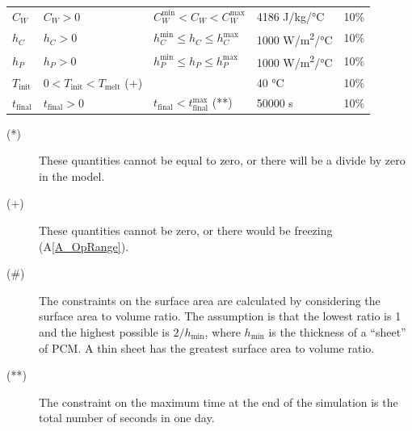\documentclass[12pt]{article}
\newcommand{\aref}[1]{A\ref{#1}}
\begin{document}
\begin{table}[!h]
\begin{longtable*}{l l l l c}
  $C_W$ & $C_W > 0$ & $C_W^{\text{min}} < C_W < C_W^{\text{max}}$ & 4186 
	\si[per-mode=symbol] {\joule\per\kilo\gram\per\celsius} & 10\%
  \\
  $h_C$ & $h_C > 0$ & $h_C^{\text{min}} \leq h_C \leq h_C^{\text{max}}$ 
	& 1000 \si[per-mode=symbol] {\watt\per\square\metre\per\celsius} & 10\%
  \\
  $h_P$ & $h_P > 0$ & $h_P^{\text{min}} \leq h_P \leq h_P^{\text{max}}$ 
	& 1000 \si[per-mode=symbol] {\watt\per\square\metre\per\celsius} & 10\%
  \\
  $T_\text{init}$ & $0 < T_\text{init} < T_\text{melt} $ (+) & & 40 \si[per-mode=symbol] {\celsius} & 10\%
  \\
  $t_\text{final}$ & $t_\text{final} > 0$ & $t_\text{final} < t_{\text{final}}^{\text{max}}$ (**) 
		& 50000 \si[per-mode=symbol] {\second} & 10\%
  \\
  \bottomrule
\end{longtable*}
\end{table}

\noindent 
\begin{description}
\item[(*)] These quantities cannot be equal to zero, or there will be a divide
  by zero in the model.
\item[(+)] These quantities cannot be zero, or there would be freezing
  (\aref{A_OpRange}).
\item[(\#)] The constraints on the surface area are calculated by considering
  the surface area to volume ratio.  The assumption is that the lowest ratio is
  1 and the highest possible is $2/h_\text{min}$, where $h_\text{min}$ is the
  thickness of a ``sheet'' of PCM.  A thin sheet has the greatest surface area to
  volume ratio.
\item[(**)] The constraint on the maximum time at the end of the simulation is 
	the total number of seconds in one day.

\end{description}
\end{document}
